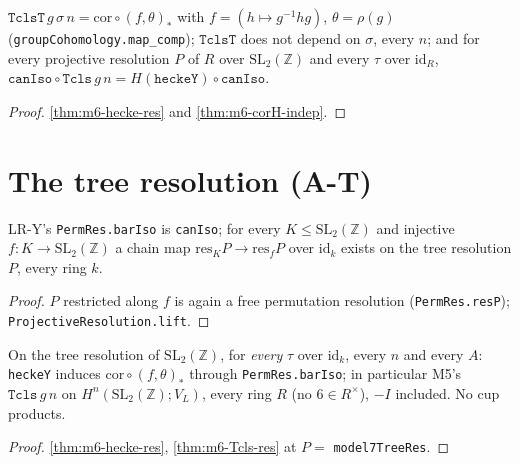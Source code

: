 \begin{theorem}\label{thm:m6-Tcls-res}
  \leanok
  $\texttt{TclsT}\,g\,\sigma\,n=\mathrm{cor}\circ(f,\theta)_*$ with $f=(h\mapsto g^{-1}hg)$, $\theta=\rho(g)$ (\texttt{groupCohomology.map\_comp});
  $\texttt{TclsT}$ does not depend on $\sigma$, every $n$; and for every projective resolution $P$ of $R$ over $\mathrm{SL}_2(\mathbb Z)$ and
  every $\tau$ over $\mathrm{id}_R$, $\texttt{canIso}\circ\texttt{Tcls}\,g\,n=H(\texttt{heckeY})\circ\texttt{canIso}$.
\end{theorem}
\begin{proof}
  \leanok
  \ref{thm:m6-hecke-res} and \ref{thm:m6-corH-indep}.
\end{proof}

\section{The tree resolution (A-T)}

\begin{lemma}\label{lem:m6-tree-tau}
  \leanok
  LR-Y's \texttt{PermRes.barIso} is \texttt{canIso}; for every $K\le\mathrm{SL}_2(\mathbb Z)$ and injective $f\colon K\to\mathrm{SL}_2(\mathbb Z)$ a
  chain map $\mathrm{res}_KP\to\mathrm{res}_fP$ over $\mathrm{id}_k$ exists on the tree resolution $P$, every ring $k$.
\end{lemma}
\begin{proof}
  \leanok
  $P$ restricted along $f$ is again a free permutation resolution (\texttt{PermRes.resP}); \texttt{ProjectiveResolution.lift}.
\end{proof}

\begin{theorem}\label{thm:m6-tree-hecke}
  \leanok
  On the tree resolution of $\mathrm{SL}_2(\mathbb Z)$, for \emph{every} $\tau$ over $\mathrm{id}_k$, every $n$ and every $A$: \texttt{heckeY}
  induces $\mathrm{cor}\circ(f,\theta)_*$ through \texttt{PermRes.barIso}; in particular M5's $\texttt{Tcls}\,g\,n$ on
  $H^n(\mathrm{SL}_2(\mathbb Z);V_L)$, every ring $R$ (no $6\in R^\times$), $-I$ included. No cup products.
\end{theorem}
\begin{proof}
  \leanok
  \ref{thm:m6-hecke-res}, \ref{thm:m6-Tcls-res} at $P=$ \texttt{model7TreeRes}.
\end{proof}

